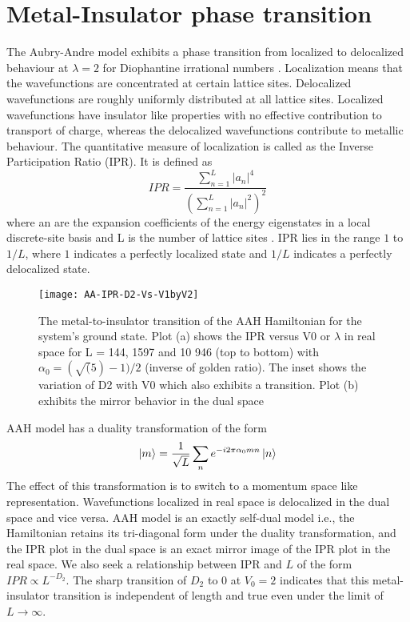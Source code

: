 \section{Metal-Insulator phase transition}
The Aubry-Andre model exhibits a phase transition from localized to delocalized behaviour at $\lambda = 2$ for Diophantine irrational numbers \cite{aulbach2004phase,aubry1980analyticity,jitomirskaya1999metal}. Localization means that the wavefunctions are concentrated at
certain lattice sites. Delocalized wavefunctions are roughly uniformly distributed at all lattice sites. Localized wavefunctions have insulator like properties with no effective
contribution to transport of charge, whereas the delocalized wavefunctions contribute to metallic behaviour. The quantitative measure of localization is called as the Inverse Participation Ratio (IPR).
It is defined as 
\begin{equation}
 IPR = \frac{\sum_{n=1}^{L} |a_{n}|^4} {(\sum_{n=1}^{L} |a_{n}|^2)^2}
\end{equation} where an are the expansion coefficients of the energy eigenstates in a local discrete-site basis and L is the number of lattice sites \cite{mishra2016phase, aulbach2004phase, aubry1980analyticity}.
IPR lies in the range $1$ to $1/L$, where $1$ indicates a perfectly localized state and $1/L$ indicates a perfectly delocalized state.

\begin{figure}[h]
\caption{ The metal-to-insulator transition of the
AAH Hamiltonian for the system’s ground state. Plot (a) shows the
IPR versus V0 or $\lambda$ in real space for L = 144, 1597 and 10 946 (top to
bottom) with $\alpha_0 = (\sqrt(5)-1)/2$ (inverse of golden ratio). The inset shows the variation of D2 with V0 which also
exhibits a transition. Plot (b) exhibits the mirror behavior in the dual
space}
\texttt{[image: AA-IPR-D2-Vs-V1byV2]}
\centering
\end{figure}
AAH model has a duality transformation of the form \cite{aubry1980analyticity,aulbach2004phase,mishra2016phase}
\begin{equation}
 \ket{m} = \frac{1}{\sqrt{L}}\sum_{n}e^{-i2\pi\alpha_0 m n} \ket{n}
\end{equation} The effect of this transformation is to switch to a momentum space like representation. Wavefunctions localized in real space is delocalized in the dual space and vice versa.
AAH model is an exactly self-dual model i.e., the Hamiltonian retains its tri-diagonal form under the duality transformation, and the IPR plot in the dual space is an
exact mirror image of the IPR plot in the real space.
We also seek a relationship between IPR and $L$ of the form $IPR \propto L^{-D_2}$. The sharp transition of $D_2$ to 0 at $V_0 = 2$ indicates that this metal-insulator transition
is independent of length and true even under the limit of $L \rightarrow \infty$.

